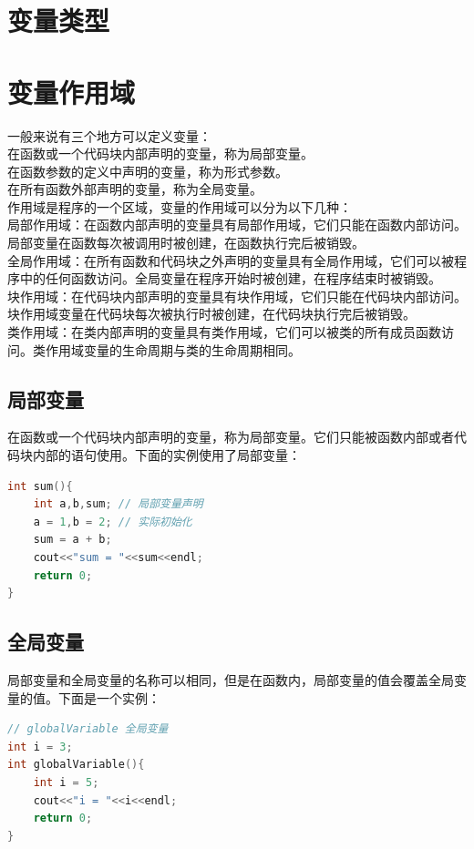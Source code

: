 \documentclass[12pt,twiside,a4paper]{ctexbook}
\numberwithin{chapter}{part}
\begin{document}
\chapter{变量类型}

\chapter{变量作用域}
一般来说有三个地方可以定义变量：\\
在函数或一个代码块内部声明的变量，称为局部变量。\\
在函数参数的定义中声明的变量，称为形式参数。\\
在所有函数外部声明的变量，称为全局变量。\\
作用域是程序的一个区域，变量的作用域可以分为以下几种：\\
局部作用域：在函数内部声明的变量具有局部作用域，它们只能在函数内部访问。局部变量在函数每次被调用时被创建，在函数执行完后被销毁。\\
全局作用域：在所有函数和代码块之外声明的变量具有全局作用域，它们可以被程序中的任何函数访问。全局变量在程序开始时被创建，在程序结束时被销毁。\\
块作用域：在代码块内部声明的变量具有块作用域，它们只能在代码块内部访问。块作用域变量在代码块每次被执行时被创建，在代码块执行完后被销毁。\\
类作用域：在类内部声明的变量具有类作用域，它们可以被类的所有成员函数访问。类作用域变量的生命周期与类的生命周期相同。

\section{局部变量}
在函数或一个代码块内部声明的变量，称为局部变量。它们只能被函数内部或者代码块内部的语句使用。下面的实例使用了局部变量：
\begin{lstlisting}[language=C++]
int sum(){
	int a,b,sum; // 局部变量声明
	a = 1,b = 2; // 实际初始化
	sum = a + b;
	cout<<"sum = "<<sum<<endl;
	return 0;
}
\end{lstlisting}

\section{全局变量}
局部变量和全局变量的名称可以相同，但是在函数内，局部变量的值会覆盖全局变量的值。下面是一个实例：
\begin{lstlisting}[language=C++]
// globalVariable 全局变量
int i = 3;
int globalVariable(){
	int i = 5;
	cout<<"i = "<<i<<endl;
	return 0;
}
\end{lstlisting}
\end{document}
